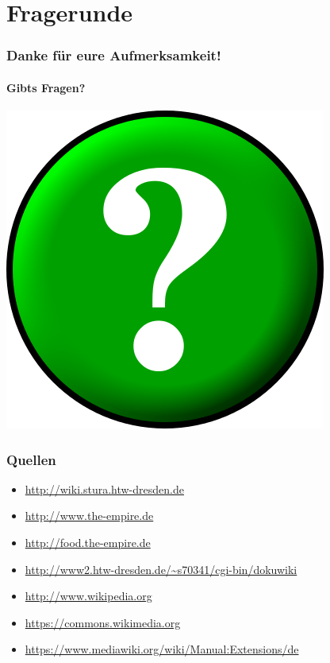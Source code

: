 \documentclass{beamer}
\begin{document}
\section{Fragerunde}

\begin{frame}
  \frametitle{Danke für eure Aufmerksamkeit!}
  \framesubtitle{Gibts Fragen?}

  \begin{center}
    \includegraphics[scale=0.5]{Circle-question_400x400.png}
  \end{center}

\end{frame}


\begin{frame}
  \frametitle{Quellen}

  \begin{itemize}
  \item \url{http://wiki.stura.htw-dresden.de}
  \item \url{http://www.the-empire.de}
  \item \url{http://food.the-empire.de}
  \item \url{http://www2.htw-dresden.de/~s70341/cgi-bin/dokuwiki}
  \item \url{http://www.wikipedia.org}
  \item \url{https://commons.wikimedia.org}
  \item \url{https://www.mediawiki.org/wiki/Manual:Extensions/de}
  \end{itemize}
  
\end{frame}
\end{document}
